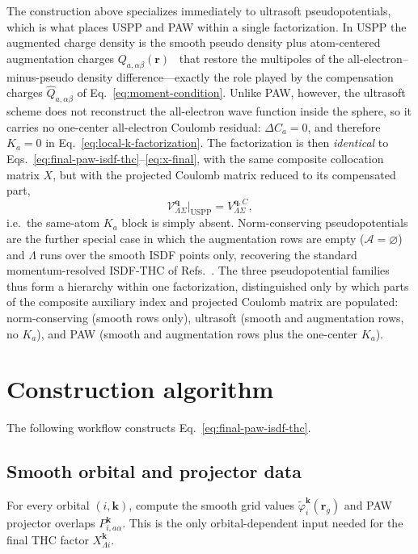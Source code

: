 \documentclass[aps,prb,reprint,superscriptaddress,longbibliography,nofootinbib]{revtex4-2}
\newcommand{\br}{\mathbf r}
\newcommand{\bk}{\mathbf k}
\newcommand{\bq}{\mathbf q}
\begin{document}
The construction above specializes immediately to ultrasoft pseudopotentials,
which is what places USPP and PAW within a single factorization.  In USPP the
augmented charge density is the smooth pseudo density plus atom-centered
augmentation charges \(Q_{a,\alpha\beta}(\br)\)~\cite{VanderbiltUSPP} that
restore the multipoles of the all-electron--minus-pseudo density
difference---exactly the role played by
the compensation charges \(\widehat Q_{a,\alpha\beta}\) of
Eq.~\eqref{eq:moment-condition}.  Unlike PAW, however, the ultrasoft scheme does
not reconstruct the all-electron wave function inside the sphere, so it carries
no one-center all-electron Coulomb residual: \(\Delta C_a=0\), and therefore
\(K_a=0\) in Eq.~\eqref{eq:local-k-factorization}.  The factorization is then
\emph{identical} to Eqs.~\eqref{eq:final-paw-isdf-thc}--\eqref{eq:x-final}, with
the same composite collocation matrix \(X\), but with the projected Coulomb
matrix reduced to its compensated part,
\begin{equation}
\mathcal V_{\Lambda\Sigma}^{\bq}\big|_{\mathrm{USPP}}
=V_{\Lambda\Sigma}^{\bq,C},
\label{eq:uspp-kernel}
\end{equation}
i.e.\ the same-atom \(K_a\) block is simply absent.  Norm-conserving
pseudopotentials are the further special case in which the augmentation rows are
empty (\(\mathcal A=\varnothing\)) and \(\Lambda\) runs over the smooth ISDF
points only, recovering the standard momentum-resolved ISDF-THC of
Refs.~.  The three pseudopotential
families thus form a hierarchy within one factorization, distinguished only by
which parts of the composite auxiliary index and projected Coulomb matrix are
populated: norm-conserving (smooth rows only), ultrasoft (smooth and
augmentation rows, no \(K_a\)), and PAW (smooth and augmentation rows plus the
one-center \(K_a\)).

\section{Construction algorithm}
\label{sec:algorithm}

The following workflow constructs Eq.~\eqref{eq:final-paw-isdf-thc}.

\subsection{Smooth orbital and projector data}

For every orbital \((i,\bk)\), compute the smooth grid values \(\widetilde\varphi_i^{\bk}(\br_g)\) and PAW projector overlaps \(P_{i,a\alpha}^{\bk}\).  This is the only orbital-dependent input needed for the final THC factor \(X_{\Lambda i}^{\bk}\).
\end{document}
